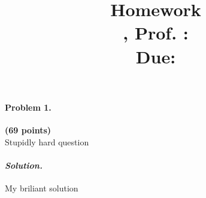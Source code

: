 \documentclass[11pt]{article}
\title{
  \vspace{2in}
  \begin{center}
    \textbf{Homework \hwNum}\\
    \vspace{0.1in}
    \small{\classNum , Prof. \professor : \semester}\\
    \vspace{0.1in}
    \large{Due: \duedate}
  \end{center}
  \vspace{1in}
  \author{\myName}
  \date{\vspace{-5ex}} %
}
\newcommand{\problem}[2]{\paragraph{Problem #1.}\textbf{(#2 points)}\\}
\newcommand{\solution}{\paragraph{\textit{Solution.}}}
\begin{document}
\maketitle \pagebreak

\problem{1}{69}
Stupidly hard question

\solution
My briliant solution
\end{document}
